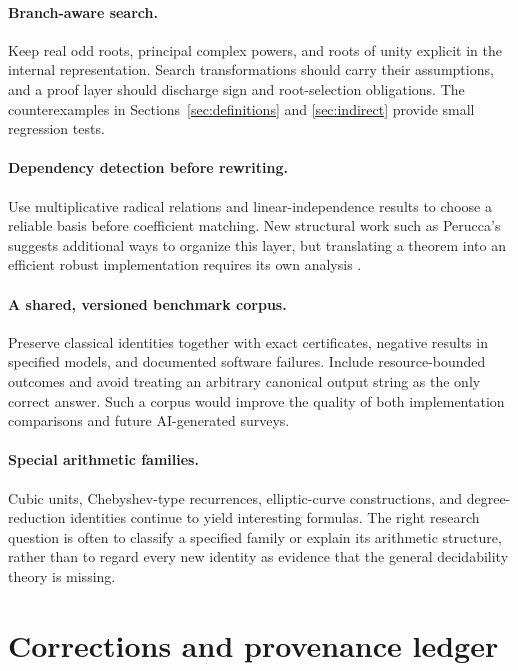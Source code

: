 \documentclass[11pt,oneside]{article}
\numberwithin{equation}{section}
\theoremstyle{definition}
\theoremstyle{remark}
\begin{document}
\paragraph{Branch-aware search.} Keep real odd roots, principal complex powers, and roots of unity explicit in the internal representation. Search transformations should carry their assumptions, and a proof layer should discharge sign and root-selection obligations. The counterexamples in Sections~\ref{sec:definitions} and \ref{sec:indirect} provide small regression tests.

\paragraph{Dependency detection before rewriting.} Use multiplicative radical relations and linear-independence results to choose a reliable basis before coefficient matching. New structural work such as Perucca's suggests additional ways to organize this layer, but translating a theorem into an efficient robust implementation requires its own analysis \cite{perucca}.

\paragraph{A shared, versioned benchmark corpus.} Preserve classical identities together with exact certificates, negative results in specified models, and documented software failures. Include resource-bounded outcomes and avoid treating an arbitrary canonical output string as the only correct answer. Such a corpus would improve the quality of both implementation comparisons and future AI-generated surveys.

\paragraph{Special arithmetic families.} Cubic units, Chebyshev-type recurrences, elliptic-curve constructions, and degree-reduction identities continue to yield interesting formulas. The right research question is often to classify a specified family or explain its arithmetic structure, rather than to regard every new identity as evidence that the general decidability theory is missing.

\section{Corrections and provenance ledger}\label{sec:corrections}
\end{document}
